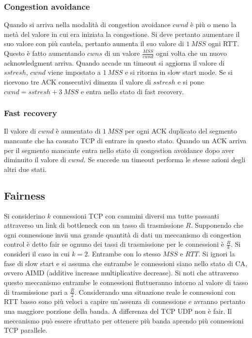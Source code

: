 \subsubsection{Congestion avoidance}
Quando si arriva nella modalit\`a di congestion avoidance $cwnd$ \`e pi\`u o meno la met\`a del valore in cui era iniziata la congestione. Si deve pertanto
aumentare il suo valore con pi\`u cautela, pertanto aumenta il suo valore di $1\ MSS$ ogni RTT. Questo \`e fatto aumentando $cwns$ di un valore $\frac{MSS}
{cwnd}$ ogni volta che un nuovo acknowledgment arriva. Quando accade un timeout si aggiorna il valore di $sstresh$, $cwnd$ viene impostato a $1\ MSS$ e si
ritorna in slow start mode. Se si ricevono tre ACK consecutivi dimezza il valore di $sstresh$  e si pone $cwnd=sstresh+3\ MSS$ e entra nello stato di fast recovery.
\subsubsection{Fast recovery}
Il valore di $cwnd$ \`e aumentato di $1\ MSS$ per ogni ACK duplicato del segmento mancante che ha causato TCP di entrare in questo stato. Quando un ACK 
arriva per il segmento mancante entra nello stato di congestion avoidance dopo aver diminuito il valore di $cwnd$. Se succede un timeout performa le stesse
azioni degli altri due stati.
\subsection{Fairness}
Si considerino $k$ connessioni TCP con cammini diversi ma tutte passanti attraverso un link di bottleneck con un tasso di trasmissione $R$. Supponendo
che ogni connessione invii una grande quantit\`a di dati un meccanismo di congestion control \`e detto fair se ognuno dei tassi di trasmissione per le 
connessioni \`e $\frac{R}{k}$. Si consideri il caso in cui $k=2$. Entrambe con lo stesso $MSS$ e $RTT$. Si ignori la fase di slow start e si assuma che 
entrambe le connessioni siano nello stato di CA, ovvero AIMD (additive increase multiplicative decrease). Si noti che attraverso questo meccanismo entrambe
le connessioni fluttueranno intorno al valore di tasso di trasmissione pari a $\frac{R}{2}$. Considerando una situazione reale le connessioni con RTT basso
sono pi\`u veloci a capire un'assenza di connessione e avranno pertanto una maggiore porzione della banda. A differenza del TCP UDP non \`e fair. Il 
meccanismo pu\`o essere sfruttato per ottenere pi\`u banda aprendo pi\`u connessioni TCP parallele.
